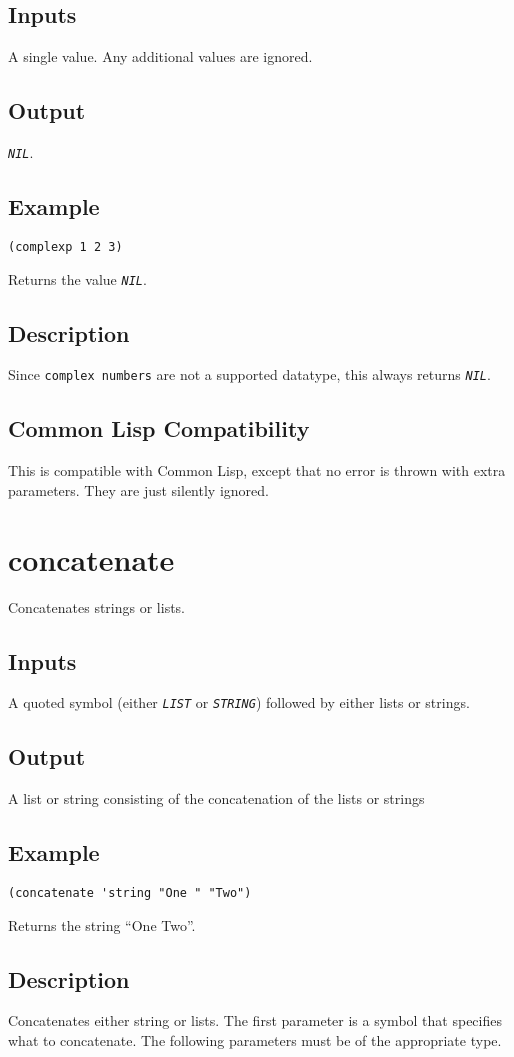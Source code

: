 \documentclass[10pt, openany]{book}
\newcommand{\constant}[1]{\emph{\texttt{#1}}}
\newcommand{\datatype}[1]{\texttt{#1}}
\newcommand{\cl}{Common Lisp}
\begin{document}
\subsection{Inputs}
A single value.  Any additional values are ignored.
\subsection{Output}
\constant{NIL}.
\subsection{Example}
\begin{lstlisting}
(complexp 1 2 3)
\end{lstlisting}
Returns the value \constant{NIL}.
\subsection{Description}
Since \datatype{complex numbers} are not a supported datatype, this always returns \constant{NIL}.
\subsection{Common Lisp Compatibility}
This is compatible with \cl, except that no error is thrown with extra parameters.  They are just silently ignored.

\section{concatenate}
Concatenates strings or lists.
\subsection{Inputs}
A quoted symbol (either \constant{LIST} or \constant{STRING}) followed by either lists or strings.
\subsection{Output}
A list or string consisting of the concatenation of the lists or strings
\subsection{Example}
\begin{lstlisting}
(concatenate 'string "One " "Two")
\end{lstlisting}
Returns the string ``One Two''.
\subsection{Description}
Concatenates either string or lists.  The first parameter is a symbol that specifies what to concatenate.  The following parameters must be of the appropriate type.
\end{document}
